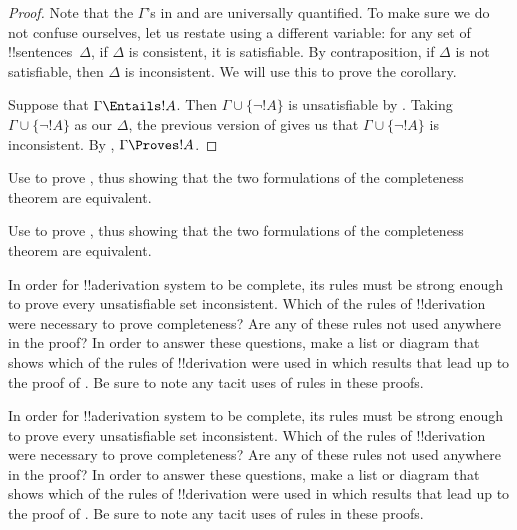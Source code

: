 \documentclass[../../../include/open-logic-section]{subfiles}
\begin{document}
\begin{proof}
Note that the $\Gamma$'s in  and
 are universally quantified.  To make sure we
do not confuse ourselves, let us restate 
using a different variable: for any set of !!{sentence}s~$\Delta$, if
$\Delta$ is consistent, it is satisfiable.  By contraposition, if
$\Delta$ is not satisfiable, then $\Delta$ is inconsistent.  We will
use this to prove the corollary.

Suppose that $\Gamma \Entails !A$.  Then $\Gamma \cup \{\lnot !A\}$ is
unsatisfiable by .  Taking $\Gamma
\cup \{\lnot !A\}$ as our $\Delta$, the previous version of
 gives us that $\Gamma \cup \{\lnot !A\}$ is
inconsistent.  By
,
$\Gamma \Proves !A$.
\end{proof}

\begin{prob}
Use  to prove
, thus showing that the two
formulations of the completeness theorem are equivalent.
\end{prob}
\tagendprob

\begin{prob}
Use  to prove
, thus showing that the two
formulations of the completeness theorem are equivalent.
\end{prob}
\tagendprob

\begin{prob}
In order for !!a{derivation} system to be complete, its rules must be
strong enough to prove every unsatisfiable set inconsistent.  Which of
the rules of !!{derivation} were necessary to prove completeness?  Are any
of these rules not used anywhere in the proof?  In order to answer
these questions, make a list or diagram that shows which of the rules
of !!{derivation} were used in which results that lead up to the proof of
.  Be sure to note any tacit
uses of rules in these proofs.
\end{prob}
\tagendprob

\begin{prob}
In order for !!a{derivation} system to be complete, its rules must be
strong enough to prove every unsatisfiable set inconsistent.  Which of
the rules of !!{derivation} were necessary to prove completeness?  Are any
of these rules not used anywhere in the proof?  In order to answer
these questions, make a list or diagram that shows which of the rules
of !!{derivation} were used in which results that lead up to the proof of
.  Be sure to note any tacit
uses of rules in these proofs.
\end{prob}
\tagendprob
\end{document}
